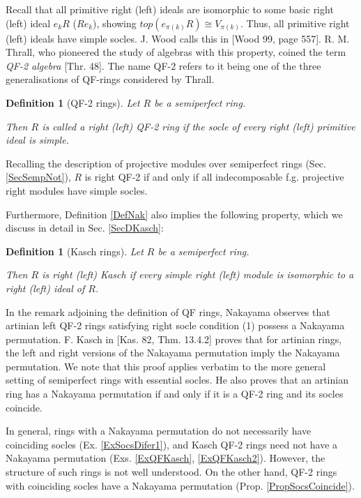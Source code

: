 \documentclass[11pt]{article}
\theoremstyle{plain}
\newtheorem{Def}[veta]{Definition}
\theoremstyle{remark}
\theoremstyle{plain}
\begin{document}
Recall that all primitive right (left) ideals are isomorphic to some basic right (left) ideal $e_kR$ ($Re_k$), showing $top(e_{\pi(k)}R)\cong V_{\pi(k)}$. Thus, all primitive right  (left) ideals have simple socles. J. Wood calls this  in [Wood 99, page 557].  R. M. Thrall, who pioneered the study of algebras with this property, coined the term \textit{QF-2 algebra} [Thr. 48]. 
The name QF-2 refers to it being one of the three generalisations of QF-rings considered by Thrall.

\begin{Def}[QF-2 rings]
    Let $R$ be a semiperfect ring. 

    Then $R$ is called a \emph{right (left) QF-2} ring if the socle of every right (left) primitive ideal is simple. 
\end{Def}
 Recalling the description of projective modules over semiperfect rings (Sec. \ref{SecSempNot}), $R$ is right QF-2 if and only if all indecomposable f.g. projective right modules have simple socles. 


 Furthermore, Definition \ref{DefNak} also implies the following property, which we discuss in detail in Sec. \ref{SecDKasch}: 
\begin{Def}[Kasch rings]
    Let $R$ be a semiperfect ring.

    Then $R$ is \emph{right (left) Kasch} if every simple right (left) module is isomorphic to a right (left) ideal of $R$.
\end{Def}
\smallskip


 In the remark adjoining the definition of QF rings, Nakayama observes that artinian left QF-2 rings satisfying right socle condition (1) possess a Nakayama permutation. F. Kasch in [Kas. 82, Thm. 13.4.2] proves that for artinian rings, the left and right versions of the Nakayama permutation imply the Nakayama permutation. We note that this proof applies verbatim to the more general setting of semiperfect rings with essential socles. He also proves that an artinian ring has a Nakayama permutation if and only if it is a QF-2 ring and its socles coincide.
 
 In general, rings with a Nakayama permutation do not necessarily have coinciding socles (Ex.  \ref{ExSocsDifer1}), and Kasch QF-2 rings need not have a Nakayama permutation  (Exs. \ref{ExQFKasch},  \ref{ExQFKasch2}). However, the structure of such rings is not well understood.  On the other hand, QF-2 rings with coinciding socles have a Nakayama permutation (Prop.  \ref{PropSocsCoincide}).
\end{document}
